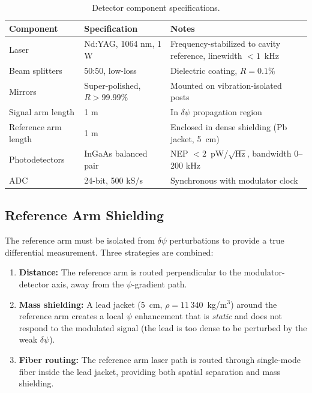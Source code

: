 \documentclass[11pt,letterpaper]{article}
\newcommand{\psifield}{\psi}
\begin{document}
\begin{table}[H]
\centering
\caption{Detector component specifications.}
\label{tab:det_specs}
\begin{tabular}{@{}llp{5cm}@{}}
\toprule
Component & Specification & Notes \\
\midrule
Laser & Nd:YAG, 1064 nm, 1 W & Frequency-stabilized to
  cavity reference, linewidth $< 1$~kHz \\
Beam splitters & 50:50, low-loss & Dielectric coating,
  $R = 0.1$\% \\
Mirrors & Super-polished, $R > 99.99\%$ & Mounted on
  vibration-isolated posts \\
Signal arm length & 1 m & In $\delta\psifield$ propagation
  region \\
Reference arm length & 1 m & Enclosed in dense shielding
  (Pb jacket, 5~cm) \\
Photodetectors & InGaAs balanced pair & NEP $< 2$~pW/$\sqrt{\text{Hz}}$,
  bandwidth 0--200 kHz \\
ADC & 24-bit, 500 kS/s & Synchronous with modulator clock \\
\bottomrule
\end{tabular}
\end{table}

\subsection{Reference Arm Shielding}

The reference arm must be isolated from $\delta\psifield$
perturbations to provide a true differential measurement. Three
strategies are combined:

\begin{enumerate}
\item \textbf{Distance:} The reference arm is routed
perpendicular to the modulator-detector axis, away from the
$\psifield$-gradient path.

\item \textbf{Mass shielding:} A lead jacket (5~cm, $\rho =
11\,340$~kg/m$^3$) around the reference arm creates a local
$\psifield$ enhancement that is \emph{static} and does not
respond to the modulated signal (the lead is too dense to be
perturbed by the weak $\delta\psifield$).

\item \textbf{Fiber routing:} The reference arm laser path is
routed through single-mode fiber inside the lead jacket, providing
both spatial separation and mass shielding.
\end{enumerate}
\end{document}
